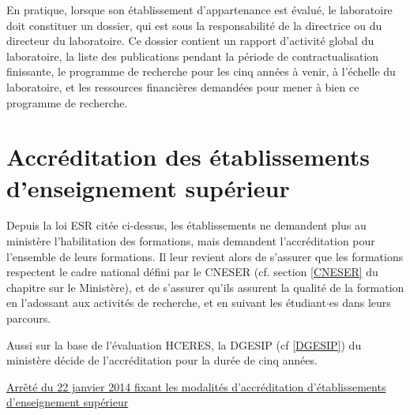 En pratique, lorsque son établissement d'appartenance est évalué, le laboratoire
doit constituer un dossier, qui est sous la responsabilité de la directrice ou du directeur du laboratoire.
Ce dossier contient un rapport
d'activit\'e global du laboratoire, la liste des publications pendant
la p\'eriode de contractualisation finissante, le programme de
recherche pour les cinq ann\'ees \`a venir, \`a l'\'echelle du
laboratoire, et les ressources financi\`eres demand\'ees
pour mener \`a bien ce programme de recherche.


\section{Accr\'editation des \'etablissements d'enseignement sup\'erieur}

Depuis la loi ESR cit\'ee ci-dessus, les \'etablissements ne demandent plus au minist\`ere l'habilitation des formations, 
mais demandent l'accr\'editation pour l'ensemble de leurs formations. Il leur revient alors de s'assurer que les formations respectent 
le cadre national d\'efini par le CNESER (cf. section \ref{CNESER} du chapitre sur le Ministère), 
et de s'assurer qu'ils assurent la qualit\'e  de la formation en l'adossant aux activit\'es de recherche, et en suivant les \'etudiant$\cdot$es dans leurs parcours. 

Aussi sur la base de l'évaluation HCERES, la DGESIP (cf \ref{DGESIP}) du ministère décide de l'accr\'editation pour la dur\'ee de cinq ann\'ees.

\href{https://www.legifrance.gouv.fr/affichTexte.do?cidTexte=JORFTEXT000028543620&categorieLien=id}{Arrêté du 22 janvier 2014 fixant les modalités d'accréditation d'établissements d'enseignement supérieur}

